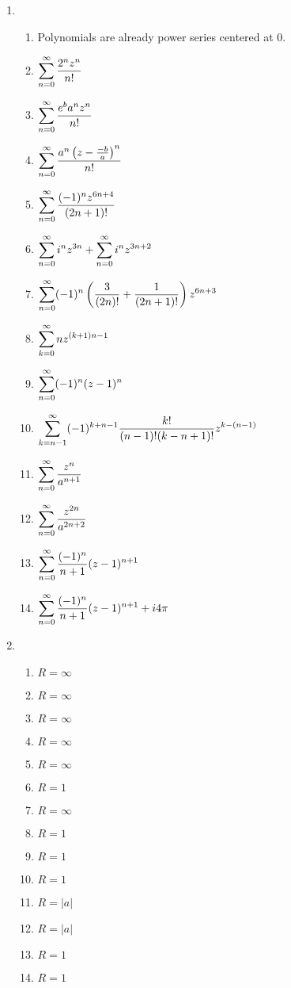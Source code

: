 \begin{enumerate}
	\item \begin{enumerate}
		\item Polynomials are already power series centered at $0$.
		\item $\displaystyle \sum_{n = 0}^\infty \frac{2^nz^n}{n!}$
		\item $\displaystyle \sum_{n = 0}^\infty \frac{e^ba^nz^n}{n!}$
		\item $\displaystyle \sum_{n = 0}^\infty \frac{a^n\left(z-\frac{-b}{a}\right)^n}{n!}$
		\item $\displaystyle \sum_{n = 0}^\infty \frac{(-1)^{n}z^{6n+4}}{(2n+1)!}$
		\item $\displaystyle \sum_{n = 0}^\infty i^{n}z^{3n} + \sum_{n=0}^\infty i^{n}z^{3n+2}$
		\item $\displaystyle \sum_{n = 0}^\infty (-1)^n \left(\frac{3}{(2n)!} + \frac{1}{(2n+1)!}\right)z^{6n+3}$
		\item $\displaystyle \sum_{k = 0}^\infty nz^{(k+1)n - 1}$
		\item $\displaystyle \sum_{n = 0}^\infty (-1)^n(z-1)^n$
		\item $\displaystyle \sum_{k = n-1}^\infty (-1)^{k+n-1} \frac{k!}{(n-1)!(k-n+1)!}z^{k-(n-1)}$
		\item $\displaystyle \sum_{n = 0}^\infty \frac{z^n}{a^{n+1}}$
		\item $\displaystyle \sum_{n = 0}^\infty \frac{z^{2n}}{a^{2n+2}}$
		\item $\displaystyle \sum_{n = 0}^\infty \frac{(-1)^n}{n+1}(z-1)^{n+1}$
		\item $\displaystyle \sum_{n = 0}^\infty \frac{(-1)^n}{n+1}(z-1)^{n+1} + i4\pi$
	
	\end{enumerate}
	
	\item \begin{enumerate}
		\item $R = \infty$
		\item $R = \infty$
		\item $R = \infty$
		\item $R = \infty$
		\item $R = \infty$
		\item $R = 1$
		\item $R = \infty$
		\item $R = 1$
		\item $R = 1$
		\item $R = 1$
		\item $R = |a|$
		\item $R = |a|$
		\item $R = 1$
		\item $R = 1$
	\end{enumerate}
	

\end{enumerate}
